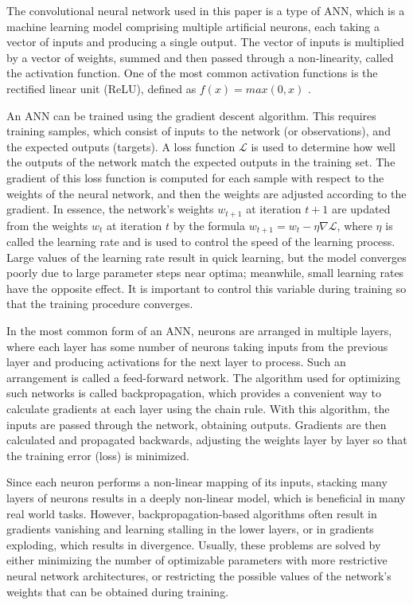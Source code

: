 \documentclass{aa}
\begin{document}
The convolutional neural network used in this paper is a type of ANN, which is a machine learning model comprising multiple artificial neurons, each taking a vector of inputs and producing a single output. The vector of inputs is multiplied by a vector of weights, summed and then passed through a non-linearity, called the activation function. One of the most common activation functions is the rectified linear unit (ReLU), defined as $f(x)=max(0,x)$ \citep{Nair:2010:RLU:3104322.3104425}.

An ANN can be trained using the gradient descent algorithm. This requires training samples, which consist of inputs to the network (or observations), and the expected outputs (targets). A loss function $\mathcal{L}$ is used to determine how well the outputs of the network match the expected outputs in the training set. The gradient of this loss function is computed for each sample with respect to the weights of the neural network, and then the weights are adjusted according to the gradient. In essence, the network's weights $w_{t+1}$ at iteration $t+1$ are updated from the weights $w_t$ at iteration $t$ by the formula $w_{t+1}=w_t-\eta\nabla\mathcal{L}$, where $\eta$ is called the learning rate and is used to control the speed of the learning process. Large values of the learning rate result in quick learning, but the model converges poorly due to large parameter steps near optima; meanwhile, small learning rates have the opposite effect. It is important to control this variable during training so that the training procedure converges.

In the most common form of an ANN, neurons are arranged in multiple layers, where each layer has some number of neurons taking inputs from the previous layer and producing activations for the next layer to process. Such an arrangement is called a feed-forward network. The algorithm used for optimizing such networks is called backpropagation, which provides a convenient way to calculate gradients at each layer using the chain rule. With this algorithm, the inputs are passed through the network, obtaining outputs. Gradients are then calculated and propagated backwards, adjusting the weights layer by layer so that the training error (loss) is minimized.

Since each neuron performs a non-linear mapping of its inputs, stacking many layers of neurons results in a deeply non-linear model, which is beneficial in many real world tasks. However, backpropagation-based algorithms often result in gradients vanishing and learning stalling in the lower layers, or in gradients exploding, which results in divergence. Usually, these problems are solved by either minimizing the number of optimizable parameters with more restrictive neural network architectures, or restricting the possible values of the network's weights that can be obtained during training.
\end{document}
